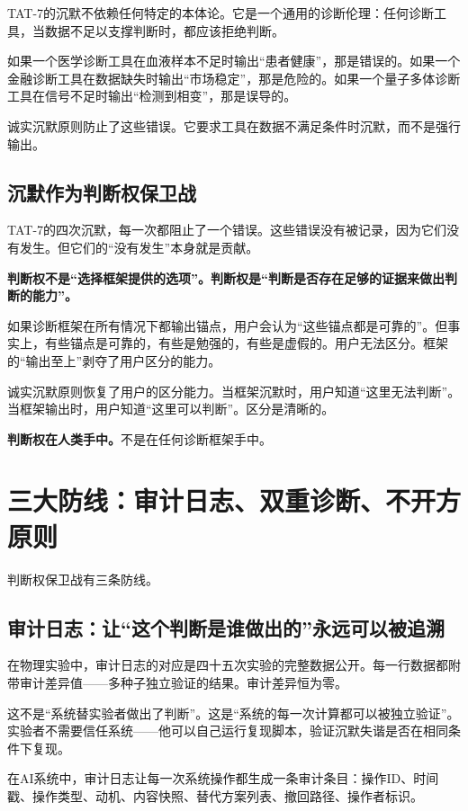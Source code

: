 \documentclass[11pt,a4paper]{book}
\theoremstyle{definition}
\begin{document}
TAT-7的沉默不依赖任何特定的本体论。它是一个通用的诊断伦理：任何诊断工具，当数据不足以支撑判断时，都应该拒绝判断。

如果一个医学诊断工具在血液样本不足时输出“患者健康”，那是错误的。如果一个金融诊断工具在数据缺失时输出“市场稳定”，那是危险的。如果一个量子多体诊断工具在信号不足时输出“检测到相变”，那是误导的。

诚实沉默原则防止了这些错误。它要求工具在数据不满足条件时沉默，而不是强行输出。

\subsection{沉默作为判断权保卫战}

TAT-7的四次沉默，每一次都阻止了一个错误。这些错误没有被记录，因为它们没有发生。但它们的“没有发生”本身就是贡献。

\textbf{判断权不是“选择框架提供的选项”。判断权是“判断是否存在足够的证据来做出判断的能力”。}

如果诊断框架在所有情况下都输出锚点，用户会认为“这些锚点都是可靠的”。但事实上，有些锚点是可靠的，有些是勉强的，有些是虚假的。用户无法区分。框架的“输出至上”剥夺了用户区分的能力。

诚实沉默原则恢复了用户的区分能力。当框架沉默时，用户知道“这里无法判断”。当框架输出时，用户知道“这里可以判断”。区分是清晰的。

\textbf{判断权在人类手中。}不是在任何诊断框架手中。

\section{三大防线：审计日志、双重诊断、不开方原则}

判断权保卫战有三条防线。

\subsection{审计日志：让“这个判断是谁做出的”永远可以被追溯}

在物理实验中，审计日志的对应是四十五次实验的完整数据公开。每一行数据都附带审计差异值——多种子独立验证的结果。审计差异恒为零。

这不是“系统替实验者做出了判断”。这是“系统的每一次计算都可以被独立验证”。实验者不需要信任系统——他可以自己运行复现脚本，验证沉默失谐是否在相同条件下复现。

在AI系统中，审计日志让每一次系统操作都生成一条审计条目：操作ID、时间戳、操作类型、动机、内容快照、替代方案列表、撤回路径、操作者标识。
\end{document}
